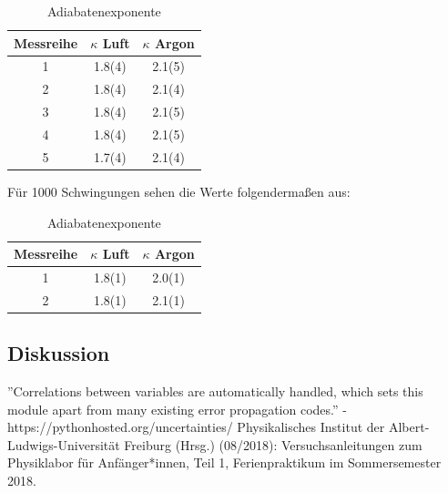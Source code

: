 \documentclass[11pt,a4paper]{article}
\begin{document}
\begin{table}[h]
\centering
\renewcommand\thetable{T1}
\caption{Adiabatenexponente}
\vspace{11pt}
\begin{tabular}{ccc}
\toprule
Messreihe & $\kappa$ Luft &  $\kappa$ Argon\\
\midrule
1 & 1.8(4) & 2.1(5)\\
2 & 1.8(4) & 2.1(4)\\
3 & 1.8(4) & 2.1(5)\\
4 & 1.8(4) & 2.1(5)\\
5 & 1.7(4) & 2.1(4)\\
\bottomrule 
\end{tabular}
\label{tab:B1}
\end{table}

F\"ur 1000 Schwingungen sehen die Werte folgenderma\ss en aus:

\begin{table}[h]
\centering
\renewcommand\thetable{T1}
\caption{Adiabatenexponente}
\vspace{11pt}
\begin{tabular}{ccc}
\toprule
Messreihe & $\kappa$ Luft &  $\kappa$ Argon\\
\midrule
1 & 1.8(1) & 2.0(1)\\
2 & 1.8(1) & 2.1(1)\\
\bottomrule 
\end{tabular}
\label{tab:B1}
\end{table}








\subsection{Diskussion}

\vfill

\begin{thebibliography}{9}
 ''Correlations between variables are automatically handled, which sets this module apart from many existing error propagation codes.'' - https://pythonhosted.org/uncertainties/
  Physikalisches Institut der Albert-Ludwigs-Universität Freiburg (Hrsg.) (08/2018): Versuchsanleitungen zum Physiklabor für Anfänger*innen, Teil 1, Ferienpraktikum im Sommersemester 2018.
 \end{thebibliography}

\pagebreak
\end{document}
